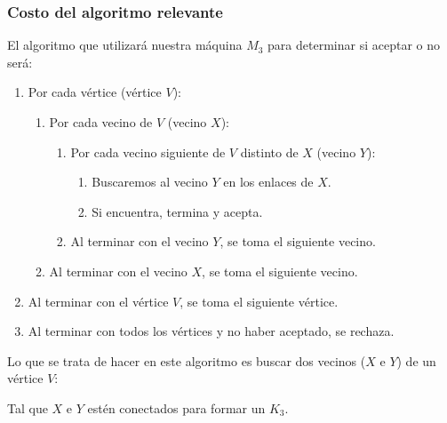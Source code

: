 \documentclass[spanish, draft]{article}
\begin{document}
    \subsubsection{Costo del algoritmo relevante}
    El algoritmo que utilizará nuestra máquina $M_3$ para determinar si aceptar o no será:
    \begin{enumerate}
      \item Por cada vértice (vértice $V$):
            \begin{enumerate}
              \item Por cada vecino de $V$ (vecino $X$):
                    \begin{enumerate}
                      \item Por cada vecino siguiente de $V$ distinto de $X$ (vecino $Y$):
                            \begin{enumerate}
                              \item Buscaremos al vecino $Y$ en los enlaces de $X$.
                              \item Si encuentra, termina y acepta.
                            \end{enumerate}
                      \item Al terminar con el vecino $Y$, se toma el siguiente vecino.
                    \end{enumerate}
              \item Al terminar con el vecino $X$, se toma el siguiente vecino.
            \end{enumerate}
      \item Al terminar con el vértice $V$, se toma el siguiente vértice.
      \item Al terminar con todos los vértices y no haber aceptado, se rechaza.
    \end{enumerate}
    
    Lo que se trata de hacer en este algoritmo es buscar dos vecinos ($X$ e $Y$) de un vértice $V$:
    
    \begin{figure}[H]
      \centering
    \end{figure}
    
    Tal que $X$ e $Y$ estén conectados para formar un $K_3$.
    
\end{document}

